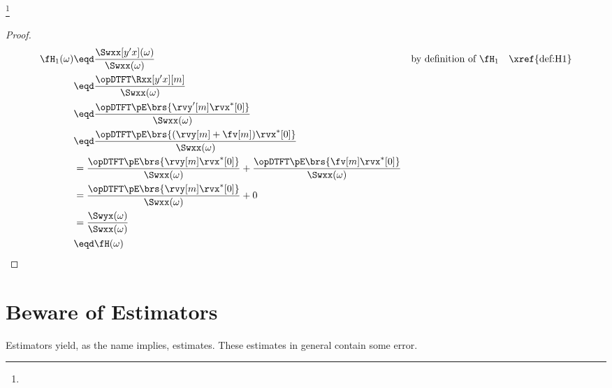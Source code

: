 \begin{proposition}
\footnote{
  }
\end{proposition}
\begin{proof}
\begin{align*}
  \fH_1(\omega)
    &\eqd \frac{\Swxx[y'x](\omega)}{\Swxx(\omega)}
    && \text{by definition of $\fH_1$}
    && \text{\xref{def:H1}}
  \\&\eqd \frac{\opDTFT\Rxx[y'x][m]}{\Swxx(\omega)}
  \\&\eqd \frac{\opDTFT\pE\brs{\rvy'[m]\rvx^\ast[0]}}{\Swxx(\omega)}
  \\&\eqd \frac{\opDTFT\pE\brs{(\rvy[m]+\fv[m])\rvx^\ast[0]}}{\Swxx(\omega)}
  \\&=    \frac{\opDTFT\pE\brs{\rvy[m]\rvx^\ast[0]}}{\Swxx(\omega)}
     +    \frac{\opDTFT\pE\brs{\fv[m]\rvx^\ast[0]}}{\Swxx(\omega)}
  \\&=    \frac{\opDTFT\pE\brs{\rvy[m]\rvx^\ast[0]}}{\Swxx(\omega)}
     +    0
  \\&=    \frac{\Swyx(\omega)}{\Swxx(\omega)}
  \\&\eqd \fH(\omega)
\end{align*}
\end{proof}

\section{Beware of Estimators}
Estimators yield, as the name implies, estimates.
These estimates in general contain some error.

